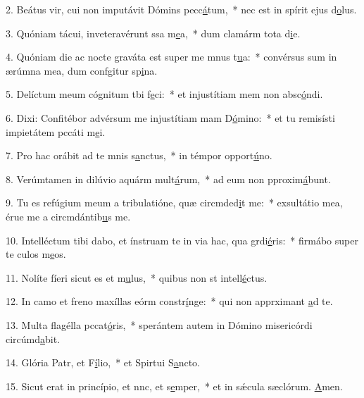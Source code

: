 2. Beátus vir, cui non imputávit Dómins pecc\uline{á}tum,~* nec est in spírit ejus d\uline{o}lus.\par 
3. Quóniam tácui, inveteravérunt ssa m\uline{e}a,~* dum clamárm tota d\uline{i}e.\par 
4. Quóniam die ac nocte graváta est super me mnus t\uline{u}a:~* convérsus sum in ærúmna mea, dum confgitur sp\uline{i}na.\par 
5. Delíctum meum cógnitum tbi f\uline{e}ci:~* et injustítiam mem non absc\uline{ó}ndi.\par 
6. Dixi: Confitébor advérsum me injustítiam mam D\uline{ó}mino:~* et tu remisísti impietátem pccáti m\uline{e}i.\par 
7. Pro hac orábit ad te mnis s\uline{a}nctus,~* in témpor opport\uline{ú}no.\par 
8. Verúmtamen in dilúvio aquárm mult\uline{á}rum,~* ad eum non pproxim\uline{á}bunt.\par 
9. Tu es refúgium meum a tribulatióne, quæ circmded\uline{i}t me:~* exsultátio mea, érue me a circmdántib\uline{u}s me.\par 
10. Intelléctum tibi dabo, et ínstruam te in via hac, qua grdi\uline{é}ris:~* firmábo super te culos m\uline{e}os.\par 
11. Nolíte fíeri sicut es et m\uline{u}lus,~* quibus non st intell\uline{é}ctus.\par 
12. In camo et freno maxíllas eórm constr\uline{í}nge:~* qui non apprximant \uline{a}d te.\par 
13. Multa flagélla pccat\uline{ó}ris,~* sperántem autem in Dómino misericórdi circúmd\uline{a}bit.\par 
14. Glória Patr, et F\uline{í}lio,~* et Spirtui S\uline{a}ncto.\par 
15. Sicut erat in princípio, et nnc, et s\uline{e}mper,~* et in sǽcula sæclórum. \uline{A}men.\par 
